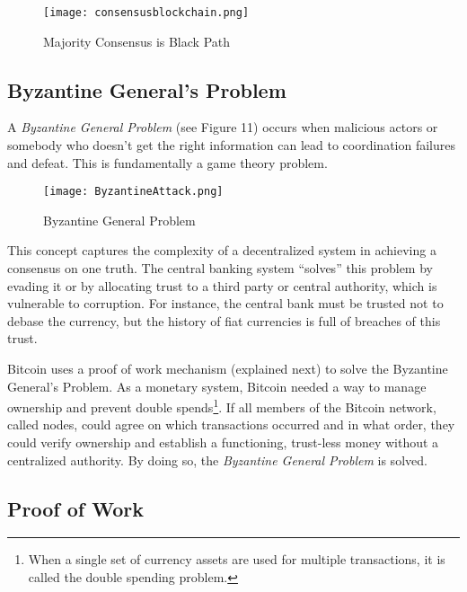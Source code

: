 \documentclass[12pt]{article}
\newcommand{\1}{\mathbbm 1}
\begin{document}
		
		
		
		\begin{figure}[H]
			\begin{Center}
				\texttt{[image: consensusblockchain.png]}	\caption{Majority Consensus is Black Path}
			\end{Center}
		\end{figure}
		
		
		\subsection{\textbf{Byzantine General's Problem}}
		
		
		
		
		
		A \textit{Byzantine General Problem} (see Figure 11) occurs when malicious actors or somebody who doesn't get the right information can lead to coordination failures and defeat. This is fundamentally a game theory problem.
		
		
		\begin{figure}[H]
			\begin{Center}
				\texttt{[image: ByzantineAttack.png]}		
				\caption{Byzantine General Problem}
			\end{Center}
		\end{figure}
		
		This concept captures the complexity of a decentralized system in achieving a consensus on one truth. The central banking system ``solves'' this problem by evading it or by allocating trust to a third party or central authority, which is vulnerable to corruption. For instance, the central bank must be trusted not to debase the currency, but the history of fiat currencies is full of breaches of this trust.
		
		Bitcoin uses a proof of work mechanism (explained next) to solve the Byzantine General's Problem. As a monetary system, Bitcoin needed a way to manage ownership and prevent double spends\footnote{When a single set of currency assets are used for multiple transactions, it is called the double spending problem.}. If all members of the Bitcoin network, called nodes, could agree on which transactions occurred and in what order, they could verify ownership and establish a functioning, trust-less money without a centralized authority. By doing so, the \textit{Byzantine General Problem} is solved.
		
		
		
		\subsection{\textbf{Proof of Work}}
		
\end{document}
